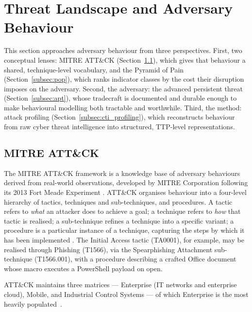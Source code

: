 
\section{Threat Landscape and Adversary Behaviour}
\label{sec:threat_landscape}

This section approaches adversary behaviour from three perspectives. First, two conceptual lenses: MITRE ATT\&CK (Section~\ref{subsec:mitre}), which gives that behaviour a shared, technique-level vocabulary, and the Pyramid of Pain (Section~\ref{subsec:pop}), which ranks indicator classes by the cost their disruption imposes on the adversary. Second, the adversary: the advanced persistent threat (Section~\ref{subsec:apt}), whose tradecraft is documented and durable enough to make behavioural modelling both tractable and worthwhile. Third, the method: attack profiling (Section~\ref{subsec:cti_profiling}), which reconstructs behaviour from raw cyber threat intelligence into structured, TTP-level representations.



\subsection{MITRE ATT\&CK}
\label{subsec:mitre}

The MITRE ATT\&CK framework is a knowledge base of adversary behaviours derived from real-world observations, developed by MITRE Corporation following its 2013 Fort Meade Experiment \cite{alsada2024}. ATT\&CK organises behaviour into a four-level hierarchy of tactics, techniques and sub-techniques, and procedures. A tactic refers to \textit{what} an attacker does to achieve a goal; a technique refers to \textit{how} that tactic is realised; a sub-technique refines a technique into a specific variant; a procedure is a particular instance of a technique, capturing the steps by which it has been implemented \cite{rodriguez2024}. The Initial Access tactic (TA0001), for example, may be realised through Phishing (T1566), via the Spearphishing Attachment sub-technique (T1566.001), with a procedure describing a crafted Office document whose macro executes a PowerShell payload on open.

ATT\&CK maintains three matrices --- Enterprise (IT networks and enterprise cloud), Mobile, and Industrial Control Systems --- of which Enterprise is the most heavily populated~\cite{alsada2024}.

